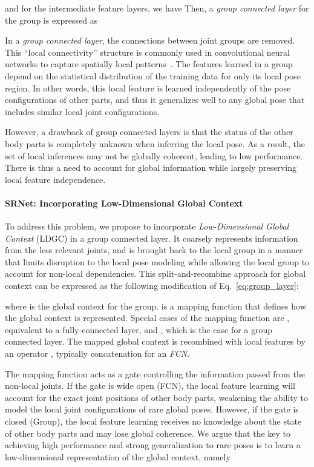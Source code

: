 \documentclass[runningheads]{llncs}
\begin{document}
and for the intermediate feature layers, we have
 Then, a \emph{group connected layer} for the  group is expressed as


In a \emph{group connected layer}, the connections between joint groups are removed. This ``local connectivity” structure is commonly used in convolutional neural networks to capture spatially local patterns~\cite{krizhevsky2012imagenet}. The features learned in a group depend on the statistical distribution of the training data for only its local pose region. In other words, this local feature is learned independently of the pose configurations of other parts, and thus it generalizes well to any global pose that includes similar local joint configurations.

However, a drawback of group connected layers is that the status of the other body parts is completely unknown when inferring the local pose. As a result, the set of local inferences may not be globally coherent, leading to low performance. There is thus a need to account for global information while largely preserving local feature independence.


\paragraph{\textbf{SRNet: Incorporating Low-Dimensional Global Context}}
To address this problem, we propose to incorporate \emph{Low-Dimensional Global Context} (LDGC) in a group connected layer. It coarsely represents information from the less relevant joints, and is brought back to the local group in a manner that limits disruption to the local pose modeling while allowing the local group to account for non-local dependencies. This split-and-recombine approach for global context can be expressed as the following modification of Eq.~\ref{eq:group_layer}:
    
where  is the global context for the  group.  is a mapping function that defines how the global context is represented. Special cases of the mapping function are , equivalent to a fully-connected layer, and , which is the case for a group connected layer. The mapped global context is recombined with local features by an operator , typically concatenation for an \emph{FCN}.

The mapping function  acts as a gate controlling the information passed from the non-local joints. If the gate is wide open (FCN), the local feature learning will account for the exact joint positions of other body parts, weakening the ability to model the local joint configurations of rare global poses. However, if the gate is closed (Group), the local feature learning receives no knowledge about the state of other body parts and may lose global coherence. We argue that the key to achieving high performance and strong generalization to rare poses is to learn a low-dimensional representation of the global context, namely
\end{document}
